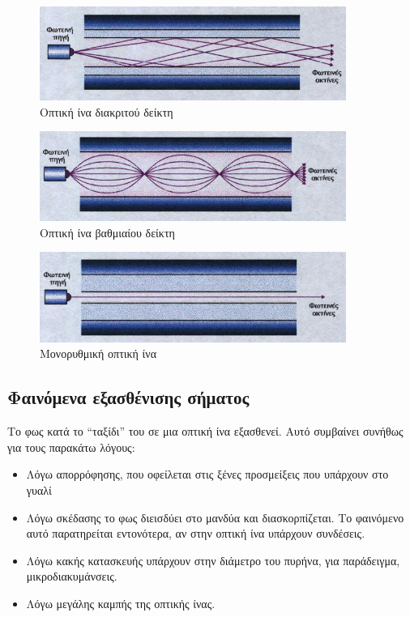 \documentclass[a4paper,11pt,titlepage]{article}
\begin{document}
\newpage
\begin{figure} [H]
\centering
\includegraphics[width=100mm]{step_index.jpg}
\caption{Οπτική ίνα διακριτού δείκτη}
\end{figure}

\begin{figure} [H] 
\centering
\includegraphics[width=100mm]{graded_index.jpg}
\caption{Οπτική ίνα βαθμιαίου δείκτη}
\end{figure}

\begin{figure} [H] 
\centering
\includegraphics[width=100mm]{single_mode.jpg}
\caption{Μονορυθμική οπτική ίνα}
\end{figure}


\subsection{Φαινόμενα εξασθένισης σήματος}
Το φως κατά το “ταξίδι” του σε μια οπτική ίνα εξασθενεί. Αυτό συμβαίνει συνήθως για τους παρακάτω λόγους:
\begin{itemize}
\item Λόγω απορρόφησης, που οφείλεται στις ξένες προσμείξεις που υπάρχουν στο γυαλί 
\item Λόγω σκέδασης το φως διεισδύει στο μανδύα και διασκορπίζεται. Το φαινόμενο αυτό παρατηρείται εντονότερα, αν στην οπτική ίνα υπάρχουν συνδέσεις.
\item Λόγω κακής κατασκευής υπάρχουν στην διάμετρο του πυρήνα, για παράδειγμα, μικροδιακυμάνσεις.
\item Λόγω μεγάλης καμπής της οπτικής ίνας.
\end{itemize}
\end{document}
